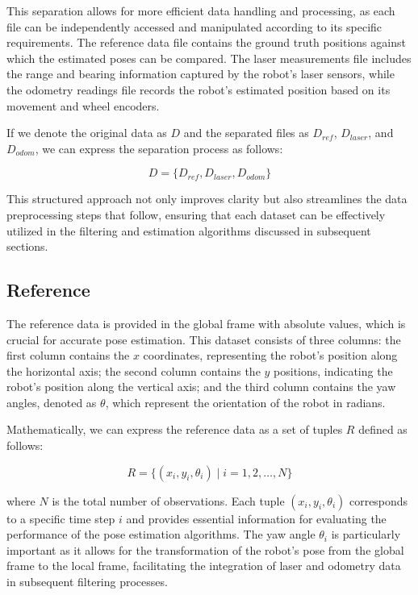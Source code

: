 \documentclass[conference]{IEEEtran}
\begin{document}
This separation allows for more efficient data handling and processing, as each file can be independently accessed and manipulated according to its specific requirements. The reference data file contains the ground truth positions against which the estimated poses can be compared. The laser measurements file includes the range and bearing information captured by the robot's laser sensors, while the odometry readings file records the robot's estimated position based on its movement and wheel encoders.

If we denote the original data as \( D \) and the separated files as \( D_{ref} \), \( D_{laser} \), and \( D_{odom} \), we can express the separation process as follows:

\[
D = \{D_{ref}, D_{laser}, D_{odom}\}
\]

This structured approach not only improves clarity but also streamlines the data preprocessing steps that follow, ensuring that each dataset can be effectively utilized in the filtering and estimation algorithms discussed in subsequent sections.

\subsection{Reference} \label{sec:reference}

The reference data is provided in the global frame with absolute values, which is crucial for accurate pose estimation. This dataset consists of three columns: the first column contains the \( x \) coordinates, representing the robot's position along the horizontal axis; the second column contains the \( y \) positions, indicating the robot's position along the vertical axis; and the third column contains the yaw angles, denoted as \( \theta \), which represent the orientation of the robot in radians.

Mathematically, we can express the reference data as a set of tuples \( R \) defined as follows:

\[
R = \{(x_i, y_i, \theta_i) \mid i = 1, 2, \ldots, N\}
\]

where \( N \) is the total number of observations. Each tuple \( (x_i, y_i, \theta_i) \) corresponds to a specific time step \( i \) and provides essential information for evaluating the performance of the pose estimation algorithms. The yaw angle \( \theta_i \) is particularly important as it allows for the transformation of the robot's pose from the global frame to the local frame, facilitating the integration of laser and odometry data in subsequent filtering processes.
\end{document}

